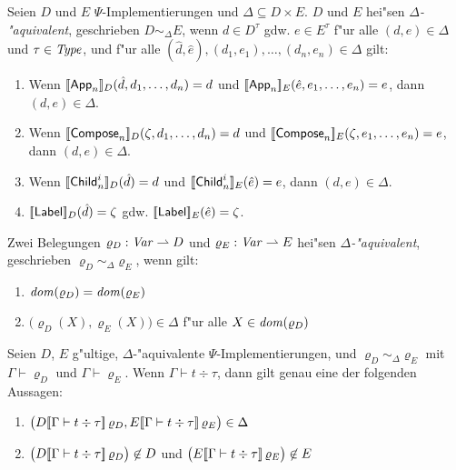 \documentclass[%
  12pt,%
  a4paper,%
]{article}
\newcommand{\Tj}[3]{{#1}\vdash{#2}\div{#3}}
\begin{document}
\begin{definition} \label{def:Aequivalenz_von_Implementierungen}
  Seien $D$ und $E$ $\Psi$-Implementierungen und $\Delta \subseteq D \times E$. $D$ und $E$ hei"sen
  \emph{$\Delta$-"aquivalent}, geschrieben $D \sim_\Delta E$, wenn $d \in D^\tau$ gdw. $e \in E^\tau$
  f"ur alle $(d,e) \in \Delta$ und $\tau \in \mathit{Type}$,
  und f"ur alle $(\hat{d},\hat{e}),(d_1,e_1),\ldots,(d_n,e_n) \in \Delta$ gilt:
  \begin{enumerate}
  \item Wenn $[\![\mathsf{App}_n]\!]_D(\hat{d},d_1,\ldots,d_n) = d$ und $[\![\mathsf{App}_n]\!]_E(\hat{e},e_1,\ldots,e_n) = e$,
    dann $(d,e) \in \Delta$.
  \item Wenn $[\![\mathsf{Compose}_n]\!]_D(\zeta,d_1,\ldots,d_n) = d$ und $[\![\mathsf{Compose}_n]\!]_E(\zeta,e_1,\ldots,e_n) = e$,
    dann $(d,e) \in \Delta$.
  \item Wenn $[\![\mathsf{Child}_n^i]\!]_D(\hat{d}) = d$ und $[\![\mathsf{Child}_n^i]\!]_E(\hat{e}) = e$,
    dann $(d,e) \in \Delta$.
  \item $[\![\mathsf{Label}]\!]_D(\hat{d}) = \zeta$ gdw. $[\![\mathsf{Label}]\!]_E(\hat{e}) = \zeta$.
  \end{enumerate}
\end{definition}
Zwei Belegungen $\varrho_D: \mathit{Var} \rightharpoonup D$ und $\varrho_E: \mathit{Var} \rightharpoonup E$ hei"sen \emph{$\Delta$-"aquivalent},
geschrieben $\varrho_D \sim_\Delta \varrho_E$, wenn gilt:
\begin{enumerate}
\item $\mathit{dom}(\varrho_D) = \mathit{dom}(\varrho_E)$
\item $\bigl(\varrho_D(X),\varrho_E(X)\bigr) \in \Delta$ f"ur alle $X \in \mathit{dom}(\varrho_D)$
\end{enumerate}

\begin{lemma} \label{lem:Aequivalenz_von_Termen}
  Seien $D$, $E$ g"ultige, $\Delta$-"aquivalente $\Psi$-Implementierungen,
  und $\varrho_D \sim_\Delta \varrho_E$ mit $\Gamma \vdash \varrho_D$ und $\Gamma \vdash \varrho_E$.
  Wenn $\Tj{\Gamma}{t}{\tau}$, dann gilt genau eine der folgenden Aussagen:
  \begin{enumerate}
  \item
    $\bigl( D\sem{\Tj{\Gamma}{t}{\tau}}\,\varrho_D, E\sem{\Tj{\Gamma}{t}{\tau}}\,\varrho_E \bigr) \in \Delta$
  \item
    $\bigl( D\sem{\Tj{\Gamma}{t}{\tau}}\,\varrho_D \bigr) \not\in D$
    und $\bigl( E\sem{\Tj{\Gamma}{t}{\tau}}\,\varrho_E \bigr) \not\in E$
  \end{enumerate}
\end{lemma}
\end{document}
